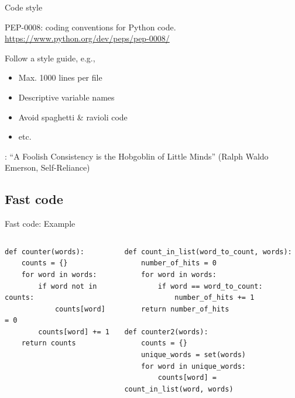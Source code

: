 \documentclass[aspectratio=169,usenames,dvipsnames]{beamer}
\begin{document}
\begin{frame}{Code style}
    \begin{reference}
        PEP-0008: coding conventions for Python code.
        \url{https://www.python.org/dev/peps/pep-0008/}
    \end{reference}
    Follow a style guide, e.g.,
    \begin{itemize}
        \item Max. 1000 lines per file
        \item Descriptive variable names
        \item Avoid spaghetti \& ravioli code
        \item etc.
    \end{itemize}
    
    :
        ``A Foolish Consistency is the Hobgoblin of Little Minds''
        (Ralph Waldo Emerson, Self-Reliance)
\end{frame}



\subsection{Fast code}
\begin{frame}[fragile]{Fast code: Example}
    \begin{columns}[T]
\begin{lstlisting}
def counter(words):
    counts = {}
    for word in words:
        if word not in counts:
            counts[word] = 0
        counts[word] += 1
    return counts
\end{lstlisting}
\begin{lstlisting}
def count_in_list(word_to_count, words):
    number_of_hits = 0
    for word in words:
        if word == word_to_count:
            number_of_hits += 1
    return number_of_hits

def counter2(words):
    counts = {}
    unique_words = set(words)
    for word in unique_words:
        counts[word] = count_in_list(word, words)
\end{lstlisting}
\end{columns}
\end{frame}
\end{document}
